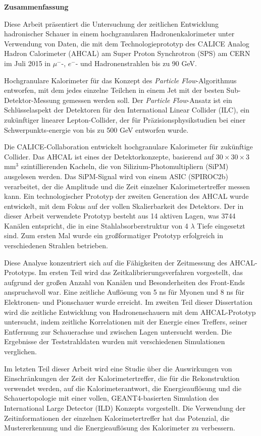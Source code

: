 \newpage
\thispagestyle{empty}
\begin{center}
{\bf Zusammenfassung}
\end{center}

Diese Arbeit präsentiert die Untersuchung der zeitlichen Entwicklung hadronischer Schauer in einem hochgranularen Hadronenkalorimeter unter Verwendung von Daten, die mit dem Technologieprototyp des CALICE Analog Hadron Calorimeter (AHCAL) am Super Proton Synchrotron (SPS) am CERN im Juli 2015 in $\mu^-$-, $e^-$- und Hadronenstrahlen bis zu 90 GeV.

Hochgranulare Kalorimeter f\"ur das Konzept des \textit{Particle Flow}-Algorithmus entworfen, mit dem jedes einzelne Teilchen in einem Jet mit der besten Sub-Detektor-Messung gemessen werden soll. Der \textit{Particle Flow}-Ansatz ist ein Schlüsselaspekt der Detektoren f\"ur den International Linear Collider (ILC), ein zukünftiger linearer Lepton-Collider, der für Präzisionsphysikstudien bei einer Schwerpunkts-energie von bis zu 500 GeV entworfen wurde.

Die CALICE-Collaboration entwickelt hochgranulare Kalorimeter für zukünftige Collider. Das AHCAL ist eines der Detektorkonzepte, basierend auf $30\times30\times3$ mm$^3$ szintillierenden Kacheln, die von Silizium-Photomultipliern (SiPM) ausgelesen werden. Das SiPM-Signal wird von einem ASIC (SPIROC2b) verarbeitet, der die Amplitude und die Zeit einzelner Kalorimetertreffer messen kann. Ein technologischer Prototyp der zweiten Generation des AHCAL wurde entwickelt, mit dem Fokus auf der vollen Skalierbarkeit des Detektors. Der in dieser Arbeit verwendete Prototyp besteht aus 14 aktiven Lagen, was 3744 Kanälen entspricht, die in eine Stahlabsorberstruktur von 4 $\lambda$ Tiefe eingesetzt sind. Zum ersten Mal wurde ein großformatiger Prototyp erfolgreich in verschiedenen Strahlen betrieben.

Diese Analyse konzentriert sich auf die Fähigkeiten der Zeitmessung des AHCAL-Prototyps. Im ersten Teil wird das Zeitkalibrierungsverfahren vorgestellt, das aufgrund der großen Anzahl von Kanälen und Besonderheiten des Front-Ends anspruchsvoll war. Eine zeitliche Auflösung von 5 ns für Myonen und 8 ns für Elektronen- und Pionschauer wurde erreicht. Im zweiten Teil dieser Dissertation wird die zeitliche Ent\-wick\-lung von Hadronenschauern mit dem AHCAL-Prototyp untersucht, indem zeitliche Korrelationen mit der Energie eines Treffers, seiner Entfernung zur Schauerachse und zwischen Lagen untersucht werden. Die Ergebnisse der Teststrahldaten wurden mit verschiedenen Simulationen verglichen.

Im letzten Teil dieser Arbeit wird eine Studie über die Auswirkungen von Einschr\"ankungen der Zeit der Kalorimetertreffer, die f\"ur die Rekonstruktion verwendet werden, auf die Kalorimeterantwort, die Energieauflösung und die Schauertopologie mit einer vollen, GEANT4-basierten Simulation des International Large Detector (ILD) Konzepts vorgestellt. Die Verwendung der Zeitinformationen der einzelnen Kalorimetertreffer hat das Potenzial, die Mustererkennung und die Energieauflösung des Kalorimeter zu verbessern.
